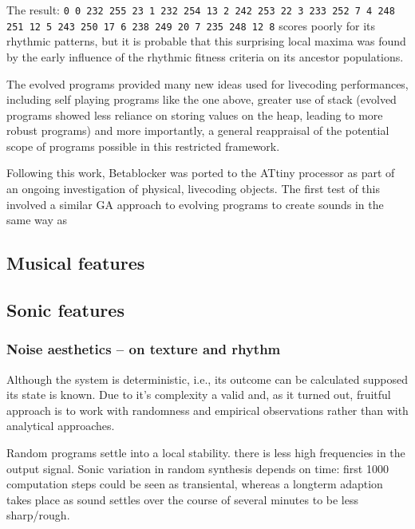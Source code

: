 \documentclass[letterpaper, 12pt]{article}
\begin{document}
The result: \texttt{0 0 232 255 23 1 232 254 13 2 242 253 22 3 233 252 7 4 248 251 12 5 243 250 17 6 238 249 20 7 235 248 12 8} scores poorly for its rhythmic patterns, but it is probable that this surprising local maxima was found by the early influence of the rhythmic fitness criteria on its ancestor populations. 

The evolved programs provided many new ideas used for livecoding performances,  including self playing programs like the one above, greater use of stack (evolved programs showed less reliance on storing values on the heap, leading to more robust programs) and more importantly, a general reappraisal of the potential scope of programs possible in this restricted framework.

Following this work, Betablocker was ported to the ATtiny processor as part of an ongoing investigation of physical, livecoding objects. The first test of this involved a similar GA approach to evolving programs to create sounds in the same way as 

\subsection{Musical features} 
\label{sub:musical_features}




\subsection{Sonic features} 
\label{sub:sonic_features}


\subsubsection{Noise aesthetics -- on texture and rhythm} 
\label{sub:noise_aesthetics}

Although the system is deterministic, i.e., its outcome can be calculated supposed its state is known.
Due to it's complexity a valid and, as it turned out, fruitful approach is to work with randomness and empirical observations rather than with analytical approaches.

Random programs settle into a local stability. there is less high frequencies in the output signal. 
Sonic variation in random synthesis depends on time: 
first 1000 computation steps could be seen as transiental, whereas a longterm adaption takes place as sound settles over the course of several minutes to be less sharp/rough.
\end{document}
